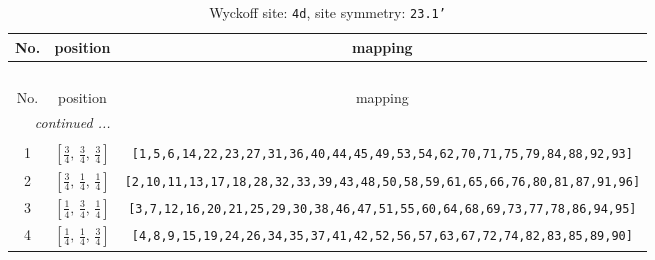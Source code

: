 \documentclass[fleqn,8pt]{jsarticle}
\begin{document}
\renewcommand{\arraystretch}{1.2}
\begin{longtable}{ccc}
\caption{Wyckoff site: {\tt 4d}, site symmetry: {\tt 23.1'}}
 \\
 \hline \hline
No. & position & mapping \\ \hline \endfirsthead

\multicolumn{2}{l}{\tablename\ \thetable{}} \\
 \hline \hline
No. & position & mapping \\ \hline \endhead

 \hline \hline
\multicolumn{2}{r}{\footnotesize\it continued ...} \\ \endfoot

 \hline \hline
\multicolumn{2}{r}{} \\ \endlastfoot

1 & $\left[ \frac{3}{4},\, \frac{3}{4},\, \frac{3}{4} \right]$ & {\tt [1,5,6,14,22,23,27,31,36,40,44,45,49,53,54,62,70,71,75,79,84,88,92,93]} \\ \hline
2 & $\left[ \frac{3}{4},\, \frac{1}{4},\, \frac{1}{4} \right]$ & {\tt [2,10,11,13,17,18,28,32,33,39,43,48,50,58,59,61,65,66,76,80,81,87,91,96]} \\ \hline
3 & $\left[ \frac{1}{4},\, \frac{3}{4},\, \frac{1}{4} \right]$ & {\tt [3,7,12,16,20,21,25,29,30,38,46,47,51,55,60,64,68,69,73,77,78,86,94,95]} \\ \hline
4 & $\left[ \frac{1}{4},\, \frac{1}{4},\, \frac{3}{4} \right]$ & {\tt [4,8,9,15,19,24,26,34,35,37,41,42,52,56,57,63,67,72,74,82,83,85,89,90]} \\
\end{longtable}
\renewcommand{\arraystretch}{1.2}
\end{document}
